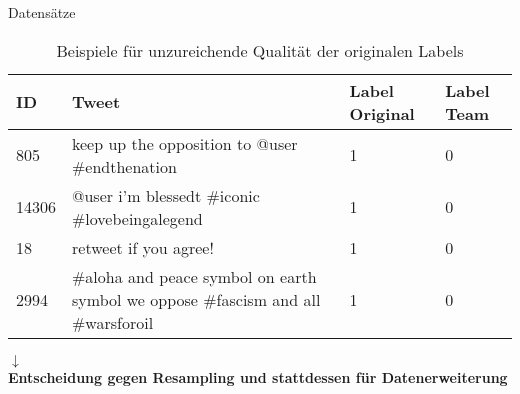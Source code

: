 \documentclass[aspectratio=169]{beamer} %
\begin{document}
\begin{frame}{Datensätze}

\begin{table}[h]
    \centering
    \begin{tabular}{|l|p{6.5cm}|p{1.4cm}|p{1.4cm}|}
        \hline
        \textbf{ID} & \textbf{Tweet} & \textbf{Label Original} & \textbf{Label Team} \\
        \hline
        805 & keep up the opposition to @user \#endthenation & 1 & 0 \\
        14306 & @user i'm blessedt #iconic \#lovebeingalegend & 1 & 0 \\
        18 & retweet if you agree!  & 1 & 0 \\
        2994 & #aloha and peace symbol on earth symbol we oppose #fascism  and all #warsforoil  & 1 & 0 \\
        \hline
    \end{tabular}
    \caption{Beispiele für unzureichende Qualität der originalen Labels}
    \label{tab:model_performance}
\end{table}

\centering
\large$\downarrow$ \\ 
\vspace{0.10cm} 
\small\textbf{Entscheidung gegen Resampling und stattdessen für Datenerweiterung}




\end{frame}
\end{document}
